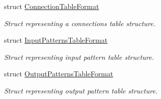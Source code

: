 \begin{DoxyCompactItemize}
struct \hyperlink{structcryomesh_1_1manager_1_1ConnectionTableFormat}{\-Connection\-Table\-Format}
\begin{DoxyCompactList}\small\item\em \-Struct representing a connections table structure. \end{DoxyCompactList}\item 
struct \hyperlink{structcryomesh_1_1manager_1_1InputPatternsTableFormat}{\-Input\-Patterns\-Table\-Format}
\begin{DoxyCompactList}\small\item\em \-Struct representing input pattern table structure. \end{DoxyCompactList}\item 
struct \hyperlink{structcryomesh_1_1manager_1_1OutputPatternsTableFormat}{\-Output\-Patterns\-Table\-Format}
\begin{DoxyCompactList}\small\item\em \-Struct representing output pattern table structure. \end{DoxyCompactList}\end{DoxyCompactItemize}
